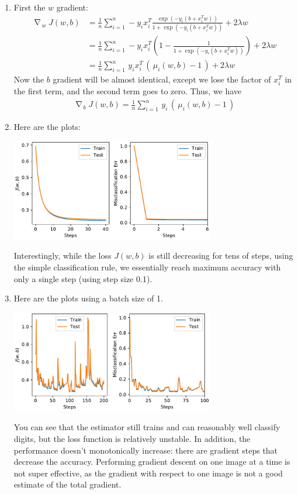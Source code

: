 \documentclass{article}
\DeclareMathOperator{\grad}{\nabla\!}
\begin{document}
\begin{enumerate}
        \item First the $w$ gradient:
        \begin{align*}
                \grad_w J(w,b) &= \frac{1}{n} \sum_{i=1}^n -y_i x_i^T \frac{\exp(-y_i(b + x_i^Tw))}{1 + \exp(-y_i(b + x_i^Tw))} + 2 \lambda w \\
                &= \frac{1}{n} \sum_{i=1}^n -y_i x_i^T \left( 1 - \frac{1}{1 + \exp(-y_i(b + x_i^Tw))} \right) + 2 \lambda w \\
                &= \frac{1}{n} \sum_{i=1}^n \, y_i x_i^T \, ( \, \mu_i(w,b) - 1 \, ) + 2 \lambda w           
        \end{align*}
        Now the $b$ gradient will be almost identical, except we lose the factor of $x_i^T$ in the first term, and the second term goes to zero.
        Thus, we have
        \begin{align*}
                \grad_b J(w,b) = \frac{1}{n} \sum_{i=1}^n \, y_i \, ( \, \mu_i(w,b) - 1 \, )
        \end{align*}

        \item Here are the plots:
        \begin{center}
                \includegraphics[width=0.7\textwidth]{code/A6b.pdf}
        \end{center}
        Interestingly, while the loss $J(w,b)$ is still decreasing for tens of steps, using the simple classification rule, we essentially reach maximum accuracy with only a single step (using step size 0.1).

        \item Here are the plots using a batch size of 1.
        \begin{center}
                \includegraphics[width=0.7\textwidth]{code/A6c.pdf}
        \end{center}
        You can see that the estimator still trains and can reasonably well classify digits, but the loss function is relatively unstable.
        In addition, the performance doesn't monotonically increase: there are gradient steps that decrease the accuracy.
        Performing gradient descent on one image at a time is not super effective, as the gradient with respect to one image is not a good estimate of the total gradient.


\end{enumerate}
\end{document}
